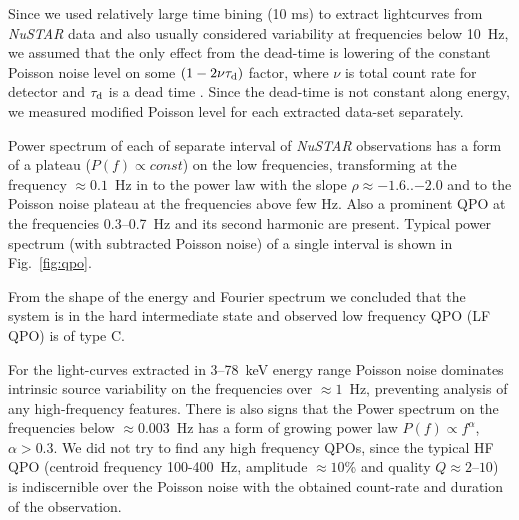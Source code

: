 \documentclass[a4paper,fleqn,usenatbib]{mnras}
\begin{document}
Since we used relatively large time bining (10 ms) to extract lightcurves from {\it NuSTAR} data and also usually considered variability at frequencies below 10~Hz, we assumed that the only effect from the dead-time is lowering of the constant Poisson noise level on some $(1 - 2\nu \tau_{\rm d})$ factor, where $\nu$ is total count rate for detector and $\tau_{\rm d}$ is a dead time \citep{1994A&A...287...73V, 1995ApJ...449..930Z}. 
Since the dead-time is not constant along energy, we measured modified Poisson level for each extracted data-set separately.


Power spectrum of each of separate interval of {\it NuSTAR} observations has a form of a plateau ($P(f)\propto const$) on the low frequencies, transforming at the frequency $\approx0.1$~Hz in to the power law with the slope $\rho\approx-1.6$..$-2.0$ and to the Poisson noise plateau at the frequencies above few Hz. 
Also a prominent QPO at the frequencies 0.3--0.7~Hz and its second harmonic are present. 
Typical power spectrum (with subtracted Poisson noise) of a single interval is shown in Fig.~\ref{fig:qpo}.

From the shape of the energy and Fourier spectrum we concluded that the system is in the hard intermediate state and observed low frequency QPO (LF QPO) is of type C. 

For the light-curves extracted in 3--78~keV energy range Poisson noise dominates intrinsic source variability on the frequencies over $\approx1$~Hz, preventing analysis of any high-frequency features.
There is also signs that the Power spectrum on the frequencies below $\approx0.003$~Hz has a form of growing power law $P(f)\propto f^{\alpha}$, $\alpha > 0.3$.
We did not try to find any high frequency QPOs, since the typical HF QPO (centroid frequency 100-400~Hz, amplitude $\approx10$\% and quality $Q\approx2$--$10$) is indiscernible over the Poisson noise with the obtained count-rate and duration of the observation.


\end{document}
